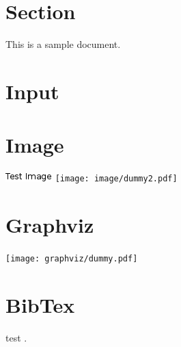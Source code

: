 \documentclass{article}
\begin{document}
\section{Section}
This is a sample document.

\section{Input}



\section{Image}
\includegraphics{image/dummy1.png}
\texttt{[image: image/dummy2.pdf]}

\section{Graphviz}
\texttt{[image: graphviz/dummy.pdf]}

\section{BibTex}
test \cite{lamport1985i1}.



\end{document}
